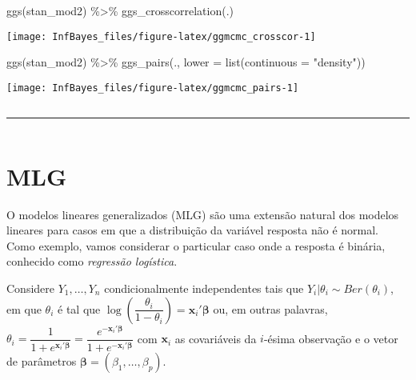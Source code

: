 \documentclass[
]{book}
\newenvironment{Shaded}{\begin{snugshade}}{\end{snugshade}}
\newcommand{\AttributeTok}[1]{\textcolor[rgb]{0.77,0.63,0.00}{#1}}
\newcommand{\FunctionTok}[1]{\textcolor[rgb]{0.00,0.00,0.00}{#1}}
\newcommand{\NormalTok}[1]{#1}
\newcommand{\SpecialCharTok}[1]{\textcolor[rgb]{0.00,0.00,0.00}{#1}}
\newcommand{\StringTok}[1]{\textcolor[rgb]{0.31,0.60,0.02}{#1}}
\begin{document}
\begin{Shaded}
\begin{Highlighting}[]
\FunctionTok{ggs}\NormalTok{(stan\_mod2) }\SpecialCharTok{\%\textgreater{}\%} \FunctionTok{ggs\_crosscorrelation}\NormalTok{(.)}
\end{Highlighting}
\end{Shaded}

\begin{center}\texttt{[image: InfBayes\_files/figure-latex/ggmcmc\_crosscor-1]} \end{center}

\begin{Shaded}
\begin{Highlighting}[]
\FunctionTok{ggs}\NormalTok{(stan\_mod2) }\SpecialCharTok{\%\textgreater{}\%} \FunctionTok{ggs\_pairs}\NormalTok{(., }\AttributeTok{lower =} \FunctionTok{list}\NormalTok{(}\AttributeTok{continuous =} \StringTok{"density"}\NormalTok{))}
\end{Highlighting}
\end{Shaded}

\begin{center}\texttt{[image: InfBayes\_files/figure-latex/ggmcmc\_pairs-1]} \end{center}

\(~\)

\begin{center}\rule{0.5\linewidth}{0.5pt}\end{center}

\(~\)

\hypertarget{mlg}{%
\section{MLG}\label{mlg}}

O modelos lineares generalizados (MLG) são uma extensão natural dos modelos lineares para casos em que a distribuição da variável resposta não é normal. Como exemplo, vamos considerar o particular caso onde a resposta é binária, conhecido como \emph{regressão logística}.

Considere \(Y_1,\ldots,Y_n\) condicionalmente independentes tais que \(Y_i|\theta_i \sim \textit{Ber}(\theta_i)\), em que \(\theta_i\) é tal que \(\log\left(\dfrac{\theta_i}{1-\theta_i}\right) = \boldsymbol x_i' \boldsymbol\beta\) ou, em outras palavras, \(\theta_i = \dfrac{1}{1+e^{\boldsymbol x_i' \boldsymbol\beta}} = \dfrac{e^{-\boldsymbol x_i' \boldsymbol\beta}}{1+e^{-\boldsymbol x_i' \boldsymbol\beta}}\) com \(\boldsymbol x_i\) as covariáveis da \(i\)-ésima observação e o vetor de parâmetros \(\boldsymbol\beta=(\beta_1,\ldots,\beta_p)\).
\end{document}
